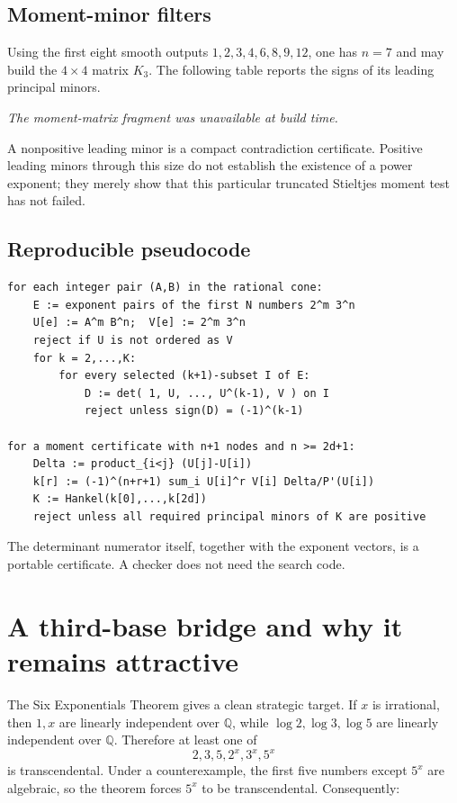 \documentclass[11pt]{article}
\theoremstyle{definition}
\theoremstyle{remark}
\newcommand{\Q}{\mathbb Q}
\begin{document}
\subsection{Moment-minor filters}

Using the first eight smooth outputs
$1,2,3,4,6,8,9,12$, one has $n=7$ and may build the $4\times4$ matrix $K_3$.
The following table reports the signs of its leading principal minors.

\begin{center}
\emph{The moment-matrix fragment was unavailable at build time.}
\end{center}

A nonpositive leading minor is a compact contradiction certificate.  Positive leading minors
through this size do not establish the existence of a power exponent; they merely show that
this particular truncated Stieltjes moment test has not failed.

\subsection{Reproducible pseudocode}

\begin{verbatim}
for each integer pair (A,B) in the rational cone:
    E := exponent pairs of the first N numbers 2^m 3^n
    U[e] := A^m B^n;  V[e] := 2^m 3^n
    reject if U is not ordered as V
    for k = 2,...,K:
        for every selected (k+1)-subset I of E:
            D := det( 1, U, ..., U^(k-1), V ) on I
            reject unless sign(D) = (-1)^(k-1)

for a moment certificate with n+1 nodes and n >= 2d+1:
    Delta := product_{i<j} (U[j]-U[i])
    k[r] := (-1)^(n+r+1) sum_i U[i]^r V[i] Delta/P'(U[i])
    K := Hankel(k[0],...,k[2d])
    reject unless all required principal minors of K are positive
\end{verbatim}

The determinant numerator itself, together with the exponent vectors, is a portable
certificate.  A checker does not need the search code.

\section{A third-base bridge and why it remains attractive}

The Six Exponentials Theorem gives a clean strategic target.  If $x$ is irrational, then
$1,x$ are linearly independent over $\Q$, while $\log2,\log3,\log5$ are linearly independent
over $\Q$.  Therefore at least one of
\[
 2,3,5,2^x,3^x,5^x
\]
is transcendental.  Under a counterexample, the first five numbers except $5^x$ are algebraic,
so the theorem forces $5^x$ to be transcendental.  Consequently:
\end{document}
